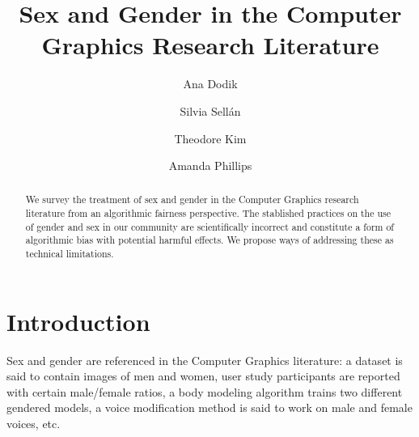 \documentclass[sigconf,balance=false]{acmart}
\begin{document}
\title{Sex and Gender in the Computer Graphics Research Literature}

\author{Ana Dodik}\authornote{}

\author{Silvia Sellán}\authornotemark[1]

\author{Theodore Kim}

\author{Amanda Phillips}



\begin{abstract}
    We survey the treatment of sex and gender in the Computer Graphics research
    literature from an algorithmic fairness perspective. The
    stablished practices on the use of gender and sex in our community are scientifically incorrect and constitute a
    form of algorithmic bias with potential harmful effects. We propose ways of addressing these as technical limitations.
\end{abstract}


\maketitle

\vspace{-0.1cm}
\section{Introduction}


Sex and gender are referenced in the Computer Graphics literature: a dataset is said to contain images of men and women, user study participants are reported with certain male/female ratios, a body modeling algorithm trains two different gendered models, a voice modification method is said to work on male and female voices, etc.

\end{document}
